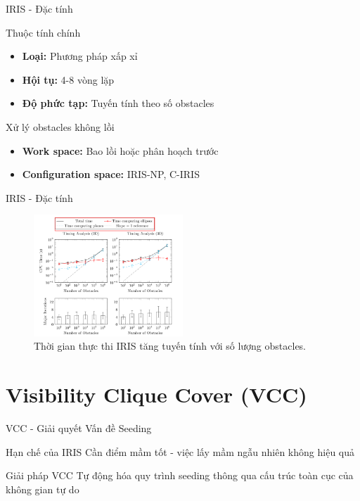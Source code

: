 \documentclass[aspectratio=169]{beamer}
\begin{document}
\begin{frame}{IRIS - Đặc tính}

    \begin{block}{Thuộc tính chính}
        \begin{itemize}
            \item \textbf{Loại:} Phương pháp xấp xỉ
            \item \textbf{Hội tụ:} 4-8 vòng lặp
            \item \textbf{Độ phức tạp:} Tuyến tính theo số obstacles
        \end{itemize}
    \end{block}

    \begin{alertblock}{Xử lý obstacles không lồi}
        \begin{itemize}
            \item \textbf{Work space:} Bao lồi hoặc phân hoạch trước
            \item \textbf{Configuration space:} IRIS-NP, C-IRIS
        \end{itemize}
    \end{alertblock}

\end{frame}

\begin{frame}{IRIS - Đặc tính}
    \begin{figure}
        \centering
        \includegraphics[width=0.5\textwidth]{../imgs/time-iris.png}
        \caption{\small Thời gian thực thi IRIS tăng tuyến tính với số lượng obstacles.}
    \end{figure}
\end{frame}

\section{Visibility Clique Cover (VCC)}

\begin{frame}{VCC - Giải quyết Vấn đề Seeding}

    \begin{alertblock}{Hạn chế của IRIS}
        Cần điểm mầm tốt - việc lấy mầm ngẫu nhiên không hiệu quả
    \end{alertblock}

    \begin{exampleblock}{Giải pháp VCC}
        Tự động hóa quy trình seeding thông qua cấu trúc toàn cục của không gian tự do
    \end{exampleblock}

\end{frame}
\end{document}
